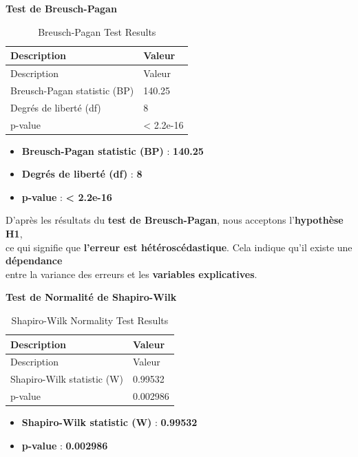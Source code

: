 \documentclass[
  12pt,
]{article}
\providecommand{\tightlist}{%
  \setlength{\itemsep}{0pt}\setlength{\parskip}{0pt}}
\begin{document}
\textbf{Test de Breusch-Pagan}

\begin{longtable}[]{@{}ll@{}}
\caption{Breusch-Pagan Test Results}\tabularnewline
\toprule\noalign{}
Description & Valeur \\
\midrule\noalign{}
\endfirsthead
\toprule\noalign{}
Description & Valeur \\
\midrule\noalign{}
\endhead
\bottomrule\noalign{}
\endlastfoot
Breusch-Pagan statistic (BP) & 140.25 \\
Degrés de liberté (df) & 8 \\
p-value & \textless{} 2.2e-16 \\
\end{longtable}

\begin{itemize}
\tightlist
\item
  \textbf{Breusch-Pagan statistic (BP)} : \textbf{140.25}\\
\item
  \textbf{Degrés de liberté (df)} : \textbf{8}\\
\item
  \textbf{p-value} : \textbf{\textless{} 2.2e-16}
\end{itemize}

D'après les résultats du \textbf{test de Breusch-Pagan}, nous acceptons
l'\textbf{hypothèse H1},\\
ce qui signifie que \textbf{l'erreur est hétéroscédastique}. Cela
indique qu'il existe une \textbf{dépendance}\\
entre la variance des erreurs et les \textbf{variables explicatives}.

\textbf{Test de Normalité de Shapiro-Wilk}

\begin{longtable}[]{@{}ll@{}}
\caption{Shapiro-Wilk Normality Test Results}\tabularnewline
\toprule\noalign{}
Description & Valeur \\
\midrule\noalign{}
\endfirsthead
\toprule\noalign{}
Description & Valeur \\
\midrule\noalign{}
\endhead
\bottomrule\noalign{}
\endlastfoot
Shapiro-Wilk statistic (W) & 0.99532 \\
p-value & 0.002986 \\
\end{longtable}

\begin{itemize}
\tightlist
\item
  \textbf{Shapiro-Wilk statistic (W)} : \textbf{0.99532}\\
\item
  \textbf{p-value} : \textbf{0.002986}
\end{itemize}
\end{document}
